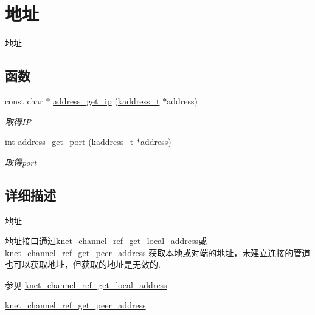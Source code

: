 \hypertarget{a00111}{}\section{地址}
\label{a00111}


地址  


\subsection*{函数}
\begin{DoxyCompactItemize}
\item 
const char $\ast$ \hyperlink{a00111_gaa1ea22192168bb6baea88feeb20eb601_gaa1ea22192168bb6baea88feeb20eb601}{address\+\_\+get\+\_\+ip} (\hyperlink{a00056_a44e99fab0348ec54cfee119ddd9ceed6_a44e99fab0348ec54cfee119ddd9ceed6}{kaddress\+\_\+t} $\ast$address)
\begin{DoxyCompactList}\small\item\em 取得\+I\+P \end{DoxyCompactList}\item 
int \hyperlink{a00111_ga9acaa00fe11bcecadea350baf9da7172_ga9acaa00fe11bcecadea350baf9da7172}{address\+\_\+get\+\_\+port} (\hyperlink{a00056_a44e99fab0348ec54cfee119ddd9ceed6_a44e99fab0348ec54cfee119ddd9ceed6}{kaddress\+\_\+t} $\ast$address)
\begin{DoxyCompactList}\small\item\em 取得port \end{DoxyCompactList}\end{DoxyCompactItemize}


\subsection{详细描述}
地址 


\begin{DoxyPre}
地址接口通过knet\_channel\_ref\_get\_local\_address或knet\_channel\_ref\_get\_peer\_address
获取本地或对端的地址，未建立连接的管道也可以获取地址，但获取的地址是无效的.
\end{DoxyPre}
 \begin{DoxySeeAlso}{参见}
\hyperlink{a00113_gaddc78bbbcee3974d351c2c1ec0340e3e_gaddc78bbbcee3974d351c2c1ec0340e3e}{knet\+\_\+channel\+\_\+ref\+\_\+get\+\_\+local\+\_\+address} 

\hyperlink{a00113_gac54b0999f21b2f481f7b8ebd17699655_gac54b0999f21b2f481f7b8ebd17699655}{knet\+\_\+channel\+\_\+ref\+\_\+get\+\_\+peer\+\_\+address} 
\end{DoxySeeAlso}


